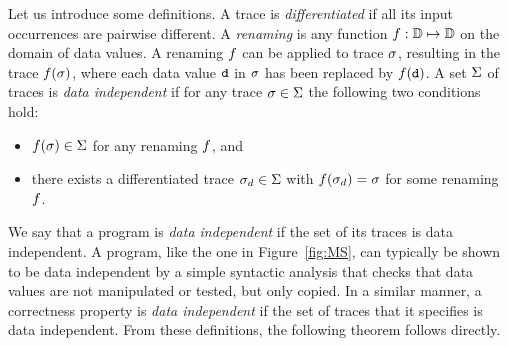 Let us introduce some definitions.
A trace is {\em differentiated} if all its
input occurrences are pairwise different.
A {\em renaming} is any function $f: \mathbb{D} \mapsto \mathbb{D}$
on the domain of data values.
A renaming $f$ can be applied to trace $\sigma$, resulting in the
trace $f(\sigma)$, where each
data value $\mbox{\tt d}$ in $\sigma$ has been replaced by $f(\mbox{\tt d})$. 
%
A set $\Sigma$ of traces is {\em data independent} if for any trace $\sigma\in\Sigma$ the  following two conditions hold:
\begin{itemize}
\item
$f(\sigma)\in\Sigma$ for any renaming $f$, and 
\item
there exists a differentiated trace $\sigma_d\in\Sigma$ with $f(\sigma_d)=\sigma$ for some renaming $f$.
\end{itemize}
We say that a program is {\em data independent} if the set of its
traces is data independent.
A program, like the one in Figure~\ref{fig:MS}, 
can typically be shown to be data independent by a simple syntactic 
analysis that checks that data values are not
manipulated or tested, but only copied.
In a similar manner, a correctness property %
%
is {\em data independent} if the set of traces that it specifies
is data independent. 
From these definitions, the following theorem follows directly.

